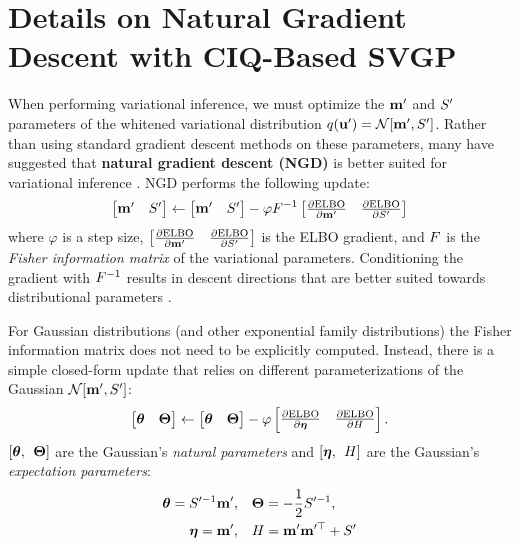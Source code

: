 \chapter{Details on Natural Gradient Descent with CIQ-Based SVGP}
\label{app:ngd}

When performing variational inference, we must optimize the $\mathbf{m}'$ and $S'$ parameters of the whitened variational distribution $q(\bu') = \normaldist{\bmm'}{\bS'}$.
Rather than using standard gradient descent methods on these parameters, many have suggested that {\bf natural gradient descent (NGD)} is better suited for variational inference \cite{hoffman2013stochastic,hensman2012fast,salimbeni2018natural}.
NGD performs the following update:
%
\begin{equation}
  \begin{bmatrix} \mathbf{m}' & S' \end{bmatrix} \gets \begin{bmatrix} \mathbf{m}' & S' \end{bmatrix} - \varphi  F^{-1}
  \begin{bmatrix} \frac{\partial \text{ELBO}}{\partial \mathbf{m}'} & \frac{\partial \text{ELBO}}{\partial S'} \end{bmatrix}
\end{equation}
%
where $\varphi$ is a step size, $\begin{bmatrix} \frac{\partial \text{ELBO}}{\partial \mathbf{m}'} & \frac{\partial \text{ELBO}}{\partial S'} \end{bmatrix}$ is the ELBO gradient, and $F$ is the \emph{Fisher information matrix} of the variational parameters.
Conditioning the gradient with $F^{-1}$ results in descent directions that are better suited towards distributional parameters \cite{hoffman2013stochastic}.

For Gaussian distributions (and other exponential family distributions) the Fisher information matrix does not need to be explicitly computed.
Instead, there is a simple closed-form update that relies on different parameterizations of the Gaussian $\normaldist{\bmm'}{\bS'}$:
%
\begin{equation}
  \begin{bmatrix} \boldsymbol{\theta} & \boldsymbol{\Theta} \end{bmatrix} \gets \begin{bmatrix} \boldsymbol{\theta} & \boldsymbol{\Theta} \end{bmatrix} - \varphi
  \begin{bmatrix} \frac{\partial \text{ELBO}}{\partial \boldsymbol{\eta}} & \frac{\partial \text{ELBO}}{\partial H} \end{bmatrix}.
\end{equation}
%
$[\boldsymbol{\theta}, \:\: \boldsymbol{\Theta}]$ are the Gaussian's \emph{natural parameters}
and $[\boldsymbol{\eta}, \:\: H]$ are the Gaussian's \emph{expectation parameters}:
%
\begin{align*}
  \boldsymbol{\theta} = S^{\prime -1} \mathbf{m}', &\quad
  \boldsymbol{\Theta} = -\frac 1 2 S^{\prime -1}, \\
  \boldsymbol{\eta} = \mathbf{m}', &\quad
  H = \mathbf{m}' \mathbf{m}^{\prime\top} + S'
\end{align*}

